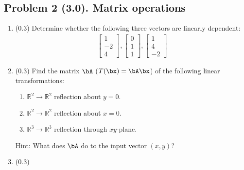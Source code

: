 \documentclass[11pt,titlepage,fleqn]{article}
\begin{document}



\subsection*{Problem 2 (3.0). Matrix operations}

\begin{enumerate}

\item (0.3) Determine whether the following three vectors are linearly dependent:
%
\begin{eqnarray*}
\left[ \begin{array}{r} 1 \\ -2 \\ 4  \end{array} \right],
\left[ \begin{array}{r} 0 \\ 1 \\ 1 \end{array} \right],
\left[ \begin{array}{r} 1 \\ 4 \\ -2 \end{array} \right]
\end{eqnarray*}


\item (0.3) Find the matrix $\bA$ ($T(\bx) = \bA\bx$) of the following linear transformations:
%
\begin{enumerate}
\item $\mathbb{R}^2 \rightarrow \mathbb{R}^2$ reflection about $y = 0$.
\item $\mathbb{R}^2 \rightarrow \mathbb{R}^2$ reflection about $x = 0$.
\item $\mathbb{R}^3 \rightarrow \mathbb{R}^3$ reflection through $xy$-plane.
\end{enumerate}
%
Hint: What does $\bA$ do to the input vector $(x,y)$?


\item (0.3)


\end{enumerate}
\end{document}
